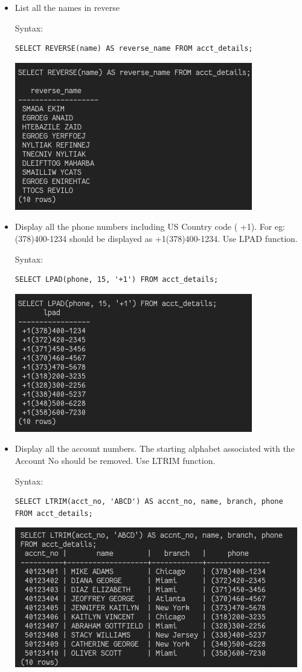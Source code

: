 \documentclass[13pt,oneside]{book}
\begin{document}
\begin{itemize}
\item
List all the names in reverse
 
Syntax:
\begin{verbatim}
SELECT REVERSE(name) AS reverse_name FROM acct_details;

\end{verbatim}
\includegraphics[]{img/p6/ss9.png}


\item
Display all the phone numbers including US Country code ( +1). For eg:
 (378)400-1234 should be displayed as +1(378)400-1234. Use LPAD function.
 
Syntax:
\begin{verbatim}
SELECT LPAD(phone, 15, '+1') FROM acct_details;

\end{verbatim}
\includegraphics[]{img/p6/ss10.png}


\item
Display all the account numbers. The starting alphabet associated with the
 Account No should be removed. Use LTRIM function.
 
Syntax:
\begin{verbatim}
SELECT LTRIM(acct_no, 'ABCD') AS accnt_no, name, branch, phone
FROM acct_details;

\end{verbatim}
\includegraphics[]{img/p6/ss11.png}



\end{itemize}
\end{document}
